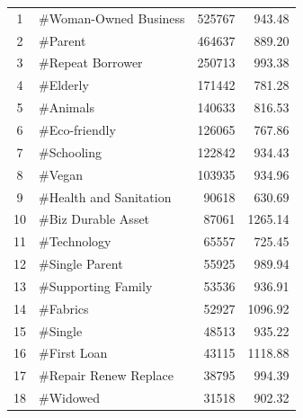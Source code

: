 \begin{longtable}{|c|l|r|r|}
	1           & \#Woman-Owned Business           & 525767                 & 943.48                       \\
	2           & \#Parent                         & 464637                 & 889.20                       \\
	3           & \#Repeat Borrower                & 250713                 & 993.38                       \\
	4           & \#Elderly                        & 171442                 & 781.28                       \\
	5           & \#Animals                        & 140633                 & 816.53                       \\
	6           & \#Eco-friendly                   & 126065                 & 767.86                       \\
	7           & \#Schooling                      & 122842                 & 934.43                       \\
	8           & \#Vegan                          & 103935                 & 934.96                       \\
	9           & \#Health and Sanitation          & 90618                  & 630.69                       \\
	10          & \#Biz Durable Asset              & 87061                  & 1265.14                      \\
	11          & \#Technology                     & 65557                  & 725.45                       \\
	12          & \#Single Parent                  & 55925                  & 989.94                       \\
	13          & \#Supporting Family              & 53536                  & 936.91                       \\
	14          & \#Fabrics                        & 52927                  & 1096.92                      \\
	15          & \#Single                         & 48513                  & 935.22                       \\
	16          & \#First Loan                     & 43115                  & 1118.88                      \\
	17          & \#Repair Renew Replace           & 38795                  & 994.39                       \\
	18          & \#Widowed                        & 31518                  & 902.32                       \\

\end{longtable}
